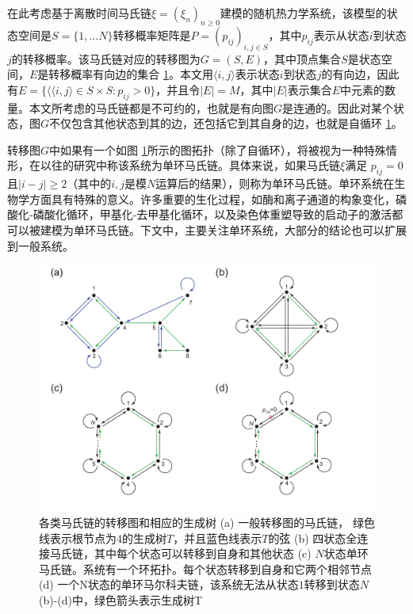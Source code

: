 
在此考虑基于离散时间马氏链$\xi = (\xi_n)_{n \ge 0}$建模的随机热力学系统，该模型的状态空间是$S = \{1, \dots N\}$转移概率矩阵是$P=(p_{ij})_{i,j \in S}$，其中$p_{ij}$表示从状态$i$到状态$j$的转移概率。该马氏链对应的转移图为$G=(S, E)$，其中顶点集合$S$是状态空间，$E$是转移概率有向边的集合 \ref{figure:transitiongraph}。本文用$\langle i, j\rangle$表示状态$i$到状态$j$的有向边，因此有$E = \{\langle \langle i, j\rangle \in S \times S: p_{ij}>0\}$，并且令$|E| = M$，其中$|E|$表示集合$E$中元素的数量。本文所考虑的马氏链都是不可约的，也就是有向图$G$是连通的。因此对某个状态，图$G$不仅包含其他状态到其的边，还包括它到其自身的边，也就是自循环 \ref{figure:transitiongraph}。

转移图$G$中如果有一个如图 \ref{figure:transitiongraph}所示的图拓扑（除了自循环），将被视为一种特殊情形，在以往的研究中称该系统为单环马氏链。具体来说，如果马氏链$\xi$满足 $p_{ij}=0$且$|i-j| \ge 2$（其中的$i,j$是模$N$运算后的结果），则称为单环马氏链。单环系统在生物学方面具有特殊的意义。许多重要的生化过程，如酶和离子通道的构象变化\cite{cornish2013fundamentals,sakmann2013single}，磷酸化-磷酸化循环\cite{beard2008chemical}，甲基化-去甲基化循环\cite{jia2017nonequilibrium}，以及染色体重塑导致的启动子的激活\cite{pedraza2008effects,jia2022analytical}都可以被建模为单环马氏链。下文中，主要关注单环系统，大部分的结论也可以扩展到一般系统。

\begin{figure}[h]\label{figure:transitiongraph}
\centering
\includegraphics[scale=0.5]{chart/transitiongraph.pdf}
\caption{各类马氏链的转移图和相应的生成树 (a) 一般转移图的马氏链， 绿色线表示根节点为4的生成树$T$，并且蓝色线表示$T$的弦 (b) 四状态全连接马氏链，其中每个状态可以转移到自身和其他状态 (c) 
$N$状态单环马氏链。系统有一个环拓扑。每个状态转移到自身和它两个相邻节点 (d) 一个N状态的单环马尔科夫链，该系统无法从状态$1$转移到状态$N$ (b)-(d)中，绿色箭头表示生成树T}
\end{figure}

